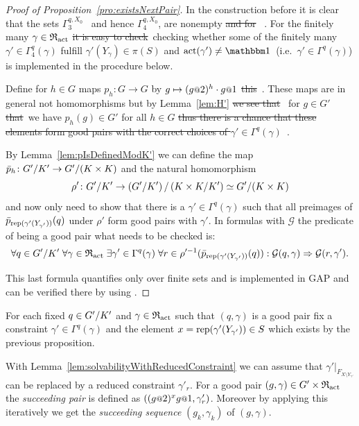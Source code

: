 \documentclass[a4paper,11pt]{amsart}
\newcommand\replace[2]{\st{#1}{\color{Green4}\ #2}}
\begin{document}
\begin{proof}[Proof of Proposition~\ref{pro:existsNextPair}]
 In the construction before it is clear that the sets $\Gamma_3^{q,X_0}$ \replace{}{and hence $\Gamma_4^{q,X_0}$,}
 are nonempty\replace{ and for }{. For} the finitely many $\gamma\in \mathfrak{R}_{\operatorname{act}}$ \replace{it is
 easy to check}{checking} whether some of the finitely many 
 $\gamma'\in\Gamma_4^{q}(\gamma)$ fulfill 
 $\gamma'(Y_\gamma) \in \pi(S)$ and $\act(\gamma')\neq\id$\replace{}{(i.e.\ $\gamma' \in\Gamma^{q}(\gamma)$) 
  is implemented in the procedure below}.
 
 
  Define for $h\in G$ maps $p_h\colon G\to G$ by $g\mapsto (g\at{2})^{h}\cdot g\at{1}$ 
  \replace{this}{. These} maps are in general not homomorphisms but 
  by Lemma~\ref{lem:H'} 
  \replace{we see that}{} for $g\in G'$ \replace{that}{we have} $p_h(g)\in G'$ for all $h\in G$\replace{ thus there is a chance 
  that these elements form good pairs with the correct choices of $\gamma' \in \Gamma^q(\gamma)$}{}. 
 
  By Lemma~\ref{lem:pIsDefinedModK'} we can define the map $\bar p_h\colon {G'/K'} \to {G'/(K\times K)}$
 and the natural homomorphism \[\rho'\colon {G'/K'} \to {\left({G'/K'}\right)/\left({K\times K/K'}\right)} \simeq {G'/(K\times K)} \]
 and now only need to show that there is a $\gamma'\in\Gamma^q(\gamma)$ such that all preimages of $\bar p_{\operatorname{rep}(\gamma'(Y_{\gamma'}))}(q)$ under $\rho'$ 
 form good pairs with $\gamma'$. In formulas with $\mathcal{G}$ the predicate of being a good pair what needs to be checked is: 
 \[\forall q\in{G'/K'}\;
      \forall \gamma\in\mathfrak{R}_{\operatorname{act}} \;
	 \exists \gamma'\in \Gamma^q(\gamma)\;
	    \forall r\in \rho'^{-1}(\bar p_{\operatorname{rep}(\gamma'(Y_{\gamma'}))}(q)):
	      \mathcal{G}(q,\gamma) \Rightarrow \mathcal{G}(r,\gamma').\]
 
 This last formula quantifies only over finite sets and is implemented in GAP 
 and can be verified there by using . 
 \end{proof}

 \begin{defi}
 For each fixed $q\in{G'/K'}$ and $\gamma\in \mathfrak{R}_{\operatorname{act}}$ such that $(q,\gamma)$ is a good pair
 fix a constraint $\gamma'\in\Gamma^q(\gamma)$ and the element 
 $x=\operatorname{rep}(\gamma'(Y_{\gamma'}))\in S$ which exists by the previous proposition.
 
 With Lemma~\ref{lem:solvabilityWithReducedConstraint} we can assume that $\gamma'|_{F_{X\setminus Y_{\gamma'}}}$ can be replaced by a reduced constraint $\gamma'_r$. 
 For a good pair $(g,\gamma)\in G'\times\mathfrak{R}_{\operatorname{act}}$ the \emph{succeeding pair} is defined as $\left((g\at{2})^xg\at{1},\gamma'_r\right)$.
 Moreover by applying this iteratively we get the \emph{succeeding sequence} $(g_k,\gamma_k)$ of $(g,\gamma)$.
 \end{defi}
\end{document}
